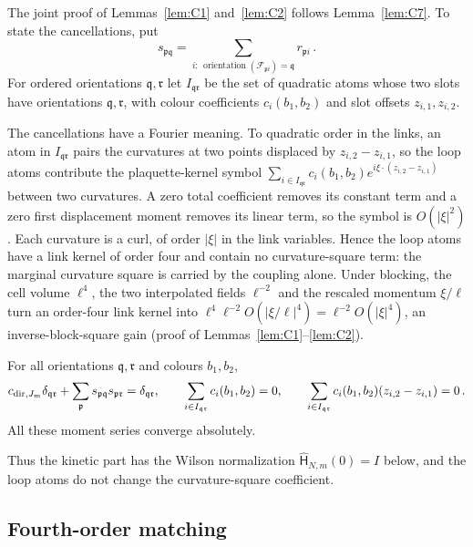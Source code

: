 The joint proof of Lemmas~\ref{lem:C1} and~\ref{lem:C2} follows Lemma~\ref{lem:C7}. To state the cancellations, put
\begin{equation*}
s_{\mathfrak p\mathfrak q}=\sum_{i:\,\operatorname{orientation}(\mathcal F_{\mathfrak p i})=\mathfrak q}r_{\mathfrak p i}\,.
\end{equation*}
For ordered orientations $\mathfrak q,\mathfrak r$ let $I_{\mathfrak q\mathfrak r}$ be the set of quadratic atoms whose two slots have orientations $\mathfrak q,\mathfrak r$, with colour coefficients $c_i(b_1,b_2)$ and slot offsets $z_{i,1},z_{i,2}$.

The cancellations have a Fourier meaning. To quadratic order in the links, an atom in $I_{\mathfrak q\mathfrak r}$ pairs the curvatures at two points displaced by $z_{i,2}-z_{i,1}$, so the loop atoms contribute the plaquette-kernel symbol $\sum_{i\in I_{\mathfrak q\mathfrak r}}c_i(b_1,b_2)e^{i\xi\cdot(z_{i,2}-z_{i,1})}$ between two curvatures. A zero total coefficient removes its constant term and a zero first displacement moment removes its linear term, so the symbol is $O(|\xi|^2)$. Each curvature is a curl, of order $|\xi|$ in the link variables. Hence the loop atoms have a link kernel of order four and contain no curvature-square term: the marginal curvature square is carried by the coupling alone. Under blocking, the cell volume $\ell^4$, the two interpolated fields $\ell^{-2}$ and the rescaled momentum $\xi/\ell$ turn an order-four link kernel into $\ell^4\ell^{-2}O(|\xi/\ell|^4)=\ell^{-2}O(|\xi|^4)$, an inverse-block-square gain (proof of Lemmas~\ref{lem:C1}--\ref{lem:C2}).

\begin{lemma}\label{lem:C2}
For all orientations $\mathfrak q,\mathfrak r$ and colours $b_1,b_2$,
\begin{equation*}
c_{{\rm dir},J_m}\delta_{\mathfrak q\mathfrak r}+
\sum_{\mathfrak p}s_{\mathfrak p\mathfrak q}s_{\mathfrak p\mathfrak r}=\delta_{\mathfrak q\mathfrak r},
\qquad
\sum_{i\in I_{\mathfrak q\mathfrak r}}c_i(b_1,b_2)=0,
\qquad \sum_{i\in I_{\mathfrak q\mathfrak r}}c_i(b_1,b_2)(z_{i,2}-z_{i,1})=0\,.
\end{equation*}
All these moment series converge absolutely.
\end{lemma}
Thus the kinetic part has the Wilson normalization $\widehat{\mathsf H}_{N,m}(0)=I$ below, and the loop atoms do not change the curvature-square coefficient.

\subsection{Fourth-order matching}\label{subsec:C-matching}

